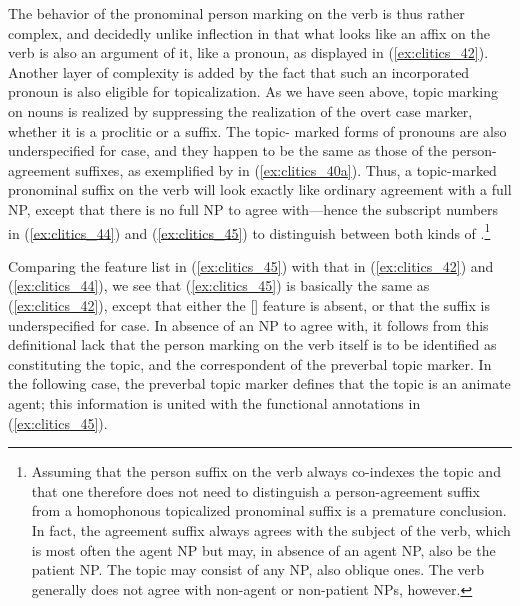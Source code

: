 The behavior of the pronominal person marking on the verb is thus rather
complex, and decidedly unlike inflection in that what looks like an affix on
the verb is also an argument of it, like a pronoun, as displayed in
(\ref{ex:clitics_42}). Another layer of complexity is added by the fact that
such an incorporated pronoun is also eligible for topicalization. As we have
seen above, topic marking on nouns is realized by suppressing the realization
of the overt case marker, whether it is a proclitic or a suffix. The topic-
marked forms of pronouns are also underspecified for case, and they happen to
be the same as those of the person-agreement suffixes, as exemplified by
 in (\ref{ex:clitics_40a}). Thus, a topic-marked pronominal
suffix on the verb will look exactly like ordinary agreement with a full NP,
except that there is no full NP to agree with---hence the subscript numbers in
(\ref{ex:clitics_44}) and (\ref{ex:clitics_45}) to distinguish between both
kinds of .\footnote{Assuming that the person suffix on the verb
always co-indexes the topic and that one therefore does not need to distinguish
a person-agreement suffix from a homophonous topicalized pronominal suffix is a
premature conclusion. In fact, the agreement suffix always agrees with the
subject of the verb, which is most often the agent NP but may, in absence of an
agent NP, also be the patient NP. The topic may consist of any NP, also oblique
ones. The verb generally does not agree with non-agent or non-patient NPs, 
however.}

\ex\label{ex:clitics_45}
\xe

Comparing the feature list in (\ref{ex:clitics_45}) with that in
(\ref{ex:clitics_42}) and (\ref{ex:clitics_44}), we see that
(\ref{ex:clitics_45}) is basically the same as (\ref{ex:clitics_42}), except
that either the [\Case{}] feature is absent, or that the suffix is
underspecified for case. In absence of an NP to agree with, it follows from
this definitional lack that the person marking on the verb itself is to be
identified as constituting the topic, and the correspondent of the preverbal
topic marker. In the following case, the preverbal topic marker defines that
the topic is an animate agent; this information is united with the functional
annotations in (\ref{ex:clitics_45}).

